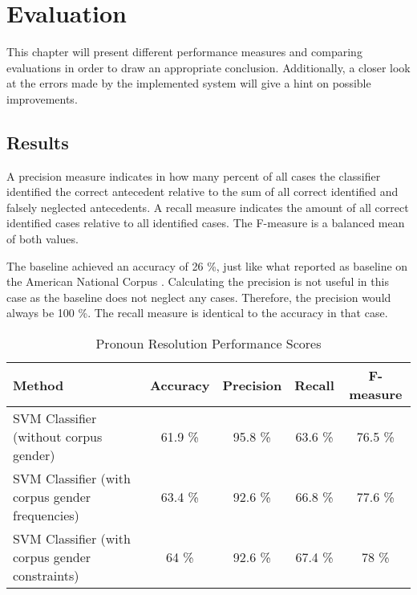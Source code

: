 \chapter{Evaluation}
\label{sec:Evaluation}

This chapter will present different performance measures and comparing evaluations in order to draw an appropriate conclusion. Additionally, a closer look at the errors made by the implemented system will give a hint on possible improvements.

\section{Results}
A precision measure indicates in how many percent of all cases the classifier identified the correct antecedent relative to the sum of all correct identified and falsely neglected antecedents. A recall measure indicates the amount of all correct identified cases relative to all identified cases. The F-measure is a balanced mean of both values.

The baseline achieved an accuracy of 26 \%, just like what \cite{bergsma2005automatic} reported as baseline on the American National Corpus \citep{ide2001american}. Calculating the precision is not useful in this case as the baseline does not neglect any cases. Therefore, the precision would always be 100 \%. The recall measure is identical to the accuracy in that case.

\begin{table}[h]
\centering
  \caption{Pronoun Resolution Performance Scores}
\begin{tabular}{|l|c|c|c|c|}
	\hline
	Method & Accuracy & Precision & Recall & F-measure \\ \hline
	\hline
	SVM Classifier (without corpus gender) & 61.9 \% & 95.8 \% & 63.6 \% & 76.5 \% \\ \hline
	SVM Classifier (with corpus gender frequencies) & 63.4 \%  & 92.6 \% & 66.8 \% & 77.6 \% \\ \hline
	SVM Classifier (with corpus gender constraints) & 64 \%  & 92.6 \% & 67.4 \% & 78 \% \\ \hline
	\end{tabular}

     \label{table:pronounResScores}
\end{table}


